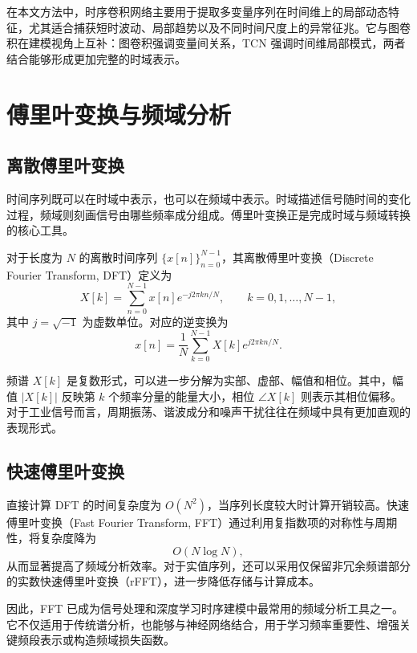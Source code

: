 在本文方法中，时序卷积网络主要用于提取多变量序列在时间维上的局部动态特征，尤其适合捕获短时波动、局部趋势以及不同时间尺度上的异常征兆。它与图卷积在建模视角上互补：图卷积强调变量间关系，TCN 强调时间维局部模式，两者结合能够形成更加完整的时域表示。

\section{傅里叶变换与频域分析}

\subsection{离散傅里叶变换}

时间序列既可以在时域中表示，也可以在频域中表示。时域描述信号随时间的变化过程，频域则刻画信号由哪些频率成分组成。傅里叶变换正是完成时域与频域转换的核心工具。

对于长度为 $N$ 的离散时间序列 $\{x[n]\}_{n=0}^{N-1}$，其离散傅里叶变换（Discrete Fourier Transform, DFT）定义为
\begin{equation}
    X[k] = \sum_{n=0}^{N-1} x[n] e^{-j 2\pi kn / N}, \qquad k = 0,1,\ldots,N-1,
\end{equation}
其中 $j = \sqrt{-1}$ 为虚数单位。对应的逆变换为
\begin{equation}
    x[n] = \frac{1}{N}\sum_{k=0}^{N-1} X[k] e^{j 2\pi kn / N}.
\end{equation}

频谱 $X[k]$ 是复数形式，可以进一步分解为实部、虚部、幅值和相位。其中，幅值 $|X[k]|$ 反映第 $k$ 个频率分量的能量大小，相位 $\angle X[k]$ 则表示其相位偏移。对于工业信号而言，周期振荡、谐波成分和噪声干扰往往在频域中具有更加直观的表现形式。

\subsection{快速傅里叶变换}

直接计算 DFT 的时间复杂度为 $O(N^2)$，当序列长度较大时计算开销较高。快速傅里叶变换（Fast Fourier Transform, FFT）通过利用复指数项的对称性与周期性，将复杂度降为
\begin{equation}
    O(N \log N),
\end{equation}
从而显著提高了频域分析效率。对于实值序列，还可以采用仅保留非冗余频谱部分的实数快速傅里叶变换（rFFT），进一步降低存储与计算成本。

因此，FFT 已成为信号处理和深度学习时序建模中最常用的频域分析工具之一。它不仅适用于传统谱分析，也能够与神经网络结合，用于学习频率重要性、增强关键频段表示或构造频域损失函数。

